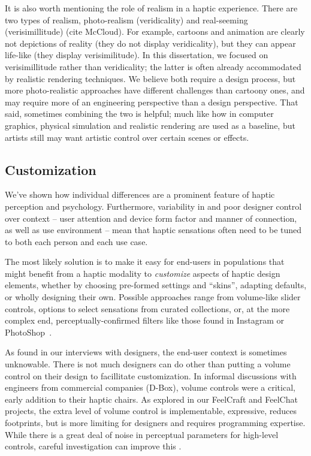 It is also worth mentioning the role of realism in a haptic experience.
There are two types of realism, photo-realism (veridicality) and real-seeming (verisimillitude) (cite McCloud).
For example, cartoons and animation are clearly not depictions of reality (they do not display veridicality), but they can appear life-like (they display verisimilitude).
In this dissertation, we focused on verisimillitude rather than veridicality; the latter is often already accommodated by realistic rendering techniques.
We believe both require a design process, but more photo-realistic approaches have different challenges than cartoony ones, and may require more of an engineering perspective than a design perspective.
That said, sometimes combining the two is helpful; much like how in computer graphics, physical simulation and realistic rendering are used as a baseline, but artists still may want artistic control over certain scenes or effects.




\subsection{Customization}
We've shown how individual differences are a prominent feature of haptic perception and psychology.
Furthermore,  variability in and poor designer control over context --  user attention and  device form factor and manner of connection, as well as use environment -- mean that haptic sensations often need to be tuned to both each person and each use case.

The most likely solution   is to make it easy for end-users in populations that might benefit from a haptic modality to \textit{customize} aspects of haptic design elements, whether by choosing pre-formed settings and ``skins'', adapting defaults, or wholly designing their own. 
Possible approaches range from volume-like slider controls, options to select sensations from curated collections, or, at the more complex end, perceptually-confirmed filters like those found in Instagram or PhotoShop~\cite{Seifi2014,seifi2015vibviz,SchneiderAsiaHaptics2014}.


As found in our interviews with designers, the end-user context is sometimes unknowable.
There is not much designers can do other than putting a volume control on their design to facillitate customization.
In informal discussions with engineers from commercial companies (\eg D-Box), volume controls were a critical, early addition to their haptic chairs.
As explored in our FeelCraft and FeelChat projects, the extra level of volume control is implementable, expressive, reduces footprints, but is more limiting for designers and requires programming expertise.
While there is a great deal of noise in perceptual parameters for high-level controls, careful investigation can improve this \cite{Israr2014,Seifi2014}.



